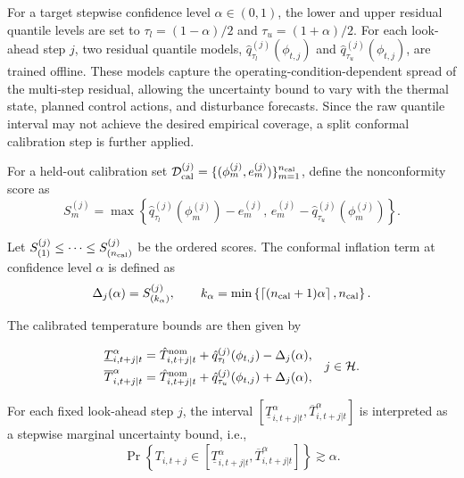 \documentclass[journal]{IEEEtran}
\theoremstyle{remark}
\begin{document}
	For a target stepwise confidence level \(\alpha\in(0,1)\), the lower
	and upper residual quantile levels are set to
	\(\tau_l=(1-\alpha)/2\) and \(\tau_u=(1+\alpha)/2\). For each
	look-ahead step \(j\), two residual quantile models,
	\(\hat q_{\tau_l}^{(j)}(\phi_{t,j})\) and
	\(\hat q_{\tau_u}^{(j)}(\phi_{t,j})\), are trained offline. These
	models capture the operating-condition-dependent spread of the
	multi-step residual, allowing the uncertainty bound to vary with the
	thermal state, planned control actions, and disturbance forecasts.
	Since the raw quantile interval may not achieve the desired empirical
	coverage, a split conformal calibration step is further applied.
	
	For a held-out calibration set
	$\mathcal D_{\rm cal}^{(j)}=\{(\phi_m^{(j)},e_m^{(j)})\}_{m=1}^{n_{\rm cal}}$,
	define the nonconformity score as
	\begin{equation}
		S_m^{(j)}
		=
		\max\left\{
		\hat q_{\tau_l}^{(j)}(\phi_m^{(j)})-e_m^{(j)},
		\,
		e_m^{(j)}-\hat q_{\tau_u}^{(j)}(\phi_m^{(j)})
		\right\}.
		\label{eq:nonconformity_score}
	\end{equation}
	
	Let
	\(S_{(1)}^{(j)}\le \cdots \le S_{(n_{\rm cal})}^{(j)}\)
	be the ordered scores. The conformal inflation term at confidence
	level \(\alpha\) is defined as
	\begin{equation}
		\Delta_j(\alpha)
		=
		S_{(k_\alpha)}^{(j)},
		\qquad
		k_\alpha
		=
		\min\left\{
		\left\lceil (n_{\rm cal}+1)\alpha \right\rceil,
		n_{\rm cal}
		\right\}.
		\label{eq:conformal_inflation}
	\end{equation}
	
	The calibrated temperature bounds are then given by
	
	\begin{equation}
		\begin{aligned}
			\underline T^\alpha_{i,t+j|t}
			&=
			\hat T^{\rm nom}_{i,t+j|t}
			+
			\hat q_{\tau_l}^{(j)}(\phi_{t,j})
			-
			\Delta_j(\alpha),\\
			\overline T^\alpha_{i,t+j|t}
			&=
			\hat T^{\rm nom}_{i,t+j|t}
			+
			\hat q_{\tau_u}^{(j)}(\phi_{t,j})
			+
			\Delta_j(\alpha),
		\end{aligned}
		\quad j\in\mathcal H .
		\label{eq:calibrated_temperature_bounds}
	\end{equation}
	
	For each fixed look-ahead step \(j\), the interval
	\([\underline T^\alpha_{i,t+j|t},
	\overline T^\alpha_{i,t+j|t}]\) is interpreted as a stepwise marginal
	uncertainty bound, i.e.,
	\begin{equation}
		\Pr\left\{
		T_{i,t+j}
		\in
		\left[
		\underline T^\alpha_{i,t+j|t},
		\overline T^\alpha_{i,t+j|t}
		\right]
		\right\}
		\gtrsim
		\alpha .
		\label{eq:stepwise_coverage}
	\end{equation}
	
\end{document}
